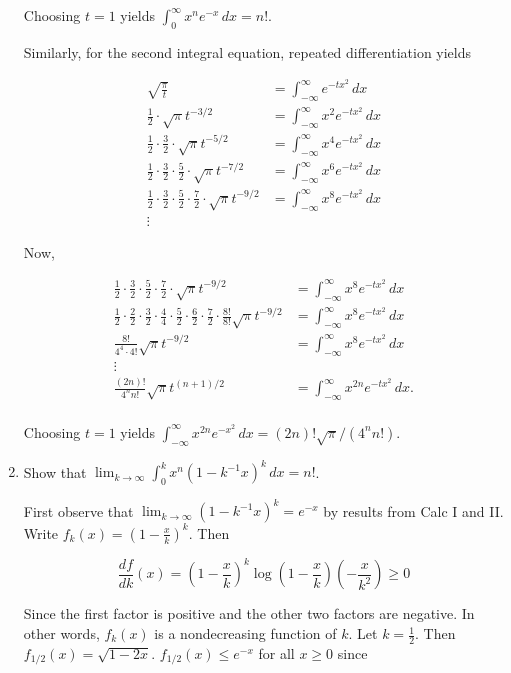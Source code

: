 \documentclass[11pt,oneside,english]{amsart}
\theoremstyle{definition}
\newcommand{\lom}[2]{\lim_{{#1}\rightarrow{#2}}}
\newcommand{\dd}[2]{\frac{d{#1}}{d{#2}}}
\begin{document}
\begin{enumerate}
Choosing $t=1$ yields $\int_0^\infty x^ne^{-x}\,dx=n!$.

Similarly, for the second integral equation, repeated differentiation yields

\begin{align*}
\sqrt{\frac{\pi}{t}}&=\int_{-\infty}^\infty e^{-tx^2}\,dx\\[2mm]
\frac{1}{2}\cdot\sqrt{\pi}t^{-3/2}&=\int_{-\infty}^\infty x^2e^{-tx^2}\,dx\\[2mm]
\frac{1}{2}\cdot\frac{3}{2}\cdot\sqrt{\pi}t^{-5/2}&=\int_{-\infty}^\infty x^4e^{-tx^2}\,dx\\[2mm]
\frac{1}{2}\cdot\frac{3}{2}\cdot\frac{5}{2}\cdot\sqrt{\pi}t^{-7/2}&=\int_{-\infty}^\infty x^6e^{-tx^2}\,dx\\[2mm]
\frac{1}{2}\cdot\frac{3}{2}\cdot\frac{5}{2}\cdot\frac{7}{2}\cdot\sqrt{\pi}t^{-9/2}&=\int_{-\infty}^\infty x^8e^{-tx^2}\,dx\\[2mm]
\vdots &
\end{align*}

Now,

\begin{align*}
\frac{1}{2}\cdot\frac{3}{2}\cdot\frac{5}{2}\cdot\frac{7}{2}\cdot\sqrt{\pi}t^{-9/2}&=\int_{-\infty}^\infty x^8e^{-tx^2}\,dx\\[2mm]
\frac{1}{2}\cdot\frac{2}{2}\cdot\frac{3}{2}\cdot\frac{4}{4}\cdot\frac{5}{2}\cdot\frac{6}{2}\cdot\frac{7}{2}\cdot\frac{8!}{8!}\sqrt{\pi}t^{-9/2}&=\int_{-\infty}^\infty x^8e^{-tx^2}\,dx\\[2mm]
\frac{8!}{4^4\cdot4!}\sqrt{\pi}t^{-9/2}&=\int_{-\infty}^\infty x^8e^{-tx^2}\,dx\\[2mm]
\vdots &\\[2mm]
\frac{(2n)!}{4^nn!}\sqrt{\pi}t^{(n+1)/2}&=\int_{-\infty}^\infty x^{2n}e^{-tx^2}\,dx.\\[2mm]
\end{align*}

Choosing $t=1$ yields $\int_{-\infty}^\infty x^{2n}e^{-x^2}\,dx=(2n)!\sqrt{\pi}/(4^nn!)$.

\item Show that $\displaystyle \lom{k}{\infty} \int_0^kx^n(1-k^{-1}x)^k\,dx=n!$.

First observe that $\lom{k}{\infty}(1-k^{-1}x)^k=e^{-x}$ by results from Calc I and II. Write $f_k(x)=\left(1-\frac{x}{k}\right)^k$. Then 

\[
\dd{f}{k}(x)=\left(1-\frac{x}{k}\right)^k\log\left(1-\frac{x}{k}\right)\left(-\frac{x}{k^2}\right)\geq0
\]

Since the first factor is positive and the other two factors are negative. In other words, $f_k(x)$ is a nondecreasing function of $k$. Let $k=\frac{1}{2}$. Then $f_{1/2}(x)=\sqrt{1-2x}$. $f_{1/2}(x)\leq e^{-x}$ for all $x\geq0$ since


\end{enumerate}
\end{document}

